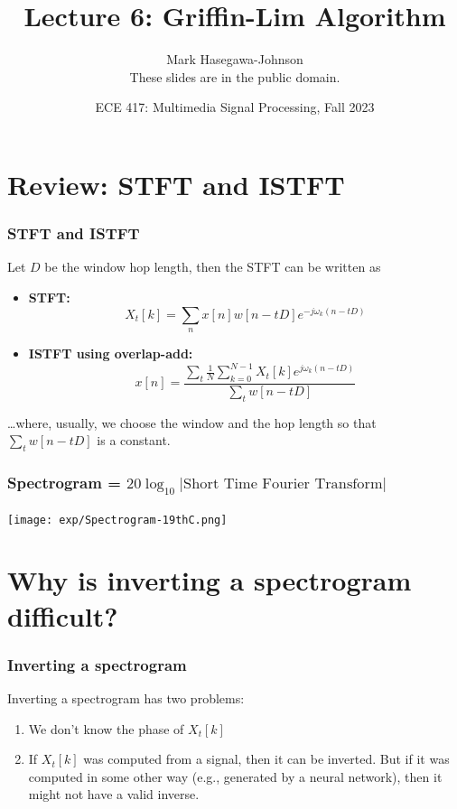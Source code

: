 \documentclass{beamer}
\title{Lecture 6: Griffin-Lim Algorithm}
\author{Mark Hasegawa-Johnson\\These slides are in the public domain.}
\date{ECE 417: Multimedia Signal Processing, Fall 2023}
\begin{document}
\begin{frame}
  \maketitle
\end{frame}

\begin{frame}
  \tableofcontents
\end{frame}

\section{Review: STFT and ISTFT}
\setcounter{subsection}{1}

\begin{frame}
  \frametitle{STFT and ISTFT}

  Let $D$ be the window hop length, then the STFT can be written as
  \begin{itemize}
  \item {\bf STFT:}
    \[
    X_t[k] = \sum_n x[n]w[n-tD]e^{-j\omega_k (n-tD)}
    \]
  \item {\bf ISTFT using overlap-add:}
    \[
    x[n] = \frac{\sum_t\frac{1}{N}\sum_{k=0}^{N-1} X_t[k]e^{j\omega_k (n-tD)}}{\sum_tw[n-tD]}
    \]
  \end{itemize}
  \ldots where, usually, we choose the window and the hop length so that
  $\sum_t w[n-tD]$ is a constant.
\end{frame}

\begin{frame}
  \frametitle{Spectrogram = $20\log_{10}|\mbox{Short Time Fourier Transform}|$}
  \centerline{\texttt{[image: exp/Spectrogram-19thC.png]}}
\end{frame}

\section[Problems]{Why is inverting a spectrogram difficult?}
\setcounter{subsection}{1}

\begin{frame}
  \frametitle{Inverting a spectrogram}

  Inverting a spectrogram has two problems:
  \begin{enumerate}
  \item We don't know the phase of $X_t[k]$
  \item If $X_t[k]$ was computed from a signal, then it can be
    inverted.  But if it was computed in some other way (e.g.,
    generated by a neural network), then it might not have a valid
    inverse.
  \end{enumerate}
\end{frame}
\end{document}
